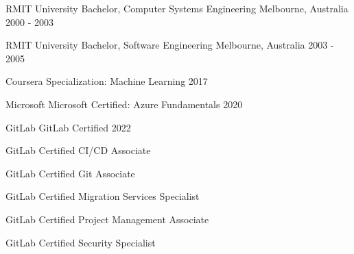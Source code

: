 

\begin{cventries}


  \cventry
    {RMIT University} %
    {Bachelor, Computer Systems Engineering} %
    {Melbourne, Australia} %
    {2000 - 2003} %
    {}

  \cventry
    {RMIT University} %
    {Bachelor, Software Engineering} %
    {Melbourne, Australia} %
    {2003 - 2005} %
    {}


  \cventry
    {Coursera} %
    {Specialization: Machine Learning} %
    {} %
    {2017} %
    {}

  \cventry
    {Microsoft} %
    {Microsoft Certified: Azure Fundamentals} %
    {} %
    {2020} %
    {}

  \cventry
    {GitLab} %
    {GitLab Certified} %
    {} %
    {2022} %
    {
      \begin{cvitems} %
        \item {GitLab Certified CI/CD Associate}
        \item {GitLab Certified Git Associate}
        \item {GitLab Certified Migration Services Specialist}
        \item {GitLab Certified Project Management Associate}
        \item {GitLab Certified Security Specialist}
      \end{cvitems}
    }



\end{cventries}
